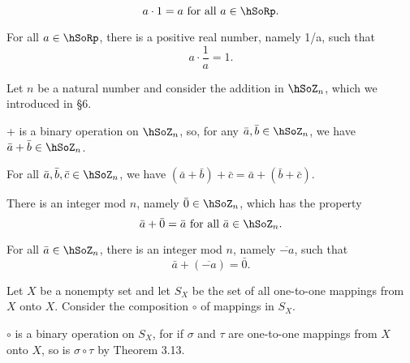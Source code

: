 \documentclass[11pt]{amsbook}
\begin{document}

\begin{exmp}
	\begin{hEnumerateAlpha}
	
		\item
		\begin{hEnumerateRoman}
		
			\item
			\[
				a \cdot 1 = a \text{ for all } a \in \hSoRp.
			\]
		
			\item
			For all $a \in \hSoRp$, there is a positive real number, namely 1/a, such that
			\[
				a \cdot \frac{1}{a} = 1.
			\]
		\end{hEnumerateRoman}
		
		\item
		Let $n$ be a natural number and consider the addition in $\hSoZ_{n}$, which we introduced in \S 6.
		\begin{hEnumerateRoman}
		
			\item
			+ is a binary operation on $\hSoZ_{n}$, so, for any $\bar a, \bar b \in \hSoZ_{n}$, we have $\bar a + \bar b \in \hSoZ_{n}$.
			
			\item
			For all $\bar a , \bar b , \bar c \in \hSoZ_{n}$, we have $(\bar a + \bar b) + \bar c = \bar a + (\bar b + \bar c)$.
			
			\item
			There is an integer mod $n$, namely $\bar 0 \in \hSoZ_{n}$, which has the property
			\[
				\bar a + \bar 0 = \bar a  \text{ for all } \bar a \in \hSoZ_{n}.
			\]
			
			\item
			For all $\bar a \in \hSoZ_{n}$, there is an integer mod $n$, namely $\overline{-a}$, such that
			\[
				\bar a + ( \overline{-a} ) = \bar 0 .
			\]
		\end{hEnumerateRoman}
		
		\item
		Let $X$ be a nonempty set and let $S_{X}$ be the set of all one-to-one mappings from $X$ onto $X$. Consider the composition $\circ$ of mappings in $S_{X}$.
		\begin{hEnumerateRoman}
		
			\item
			$\circ$ is a binary operation on $S_{X}$, for if $\sigma$ and $\tau$ are one-to-one mappings from $X$ onto $X$, so is $\sigma \circ \tau$ by Theorem 3.13. %
			

\end{hEnumerateRoman}
\end{hEnumerateAlpha}
\end{exmp}
\end{document}
